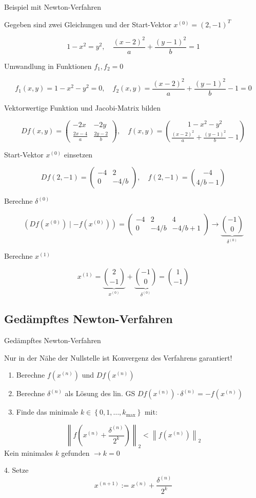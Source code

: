 \begin{example2}{Beispiel mit Newton-Verfahren}
    
Gegeben sind zwei Gleichungen und der Start-Vektor $x^{(0)}=(2,-1)^T$

$$
1-x^2=y^2, \quad \frac{(x-2)^2}{a}+\frac{(y-1)^2}{b}=1
$$


Umwandlung in Funktionen $f_1, f_2=0$

$$
f_1(x, y)=1-x^2-y^2=0, \quad f_2(x, y)=\frac{(x-2)^2}{a}+\frac{(y-1)^2}{b}-1=0
$$


Vektorwertige Funktion und Jacobi-Matrix bilden

$$
D f(x, y)=\left(\begin{array}{cc}
-2 x & -2 y \\
\frac{2 x-4}{a} & \frac{2 y-2}{b}
\end{array}\right), \quad f(x, y)=\binom{1-x^2-y^2}{\frac{(x-2)^2}{a}+\frac{(y-1)^2}{b}-1}
$$


Start-Vektor $x^{(0)}$ einsetzen

$$
D f(2,-1)=\left(\begin{array}{cc}
-4 & 2 \\
0 & -4 / b
\end{array}\right), \quad f(2,-1)=\binom{-4}{4 / b-1}
$$


Berechne $\delta^{(0)}$

$$
\left(D f\left(x^{(0)}\right) \mid-f\left(x^{(0)}\right)\right)=\left(\begin{array}{cc|c}
-4 & 2 & 4 \\
0 & -4 / b & -4 / b+1
\end{array}\right) \rightarrow \underbrace{\binom{-1}{0}}_{\delta^{(0)}}
$$


Berechne $x^{(1)}$

$$
x^{(1)}=\underbrace{\binom{2}{-1}}_{x^{(0)}}+\underbrace{\binom{-1}{0}}_{\delta^{(0)}}=\binom{1}{-1}
$$
\end{example2}

\subsection{Gedämpftes Newton-Verfahren}

\begin{corollary}{Gedämpftes Newton-Verfahren}

Nur in der Nähe der Nullstelle ist Konvergenz des Verfahrens garantiert!
\begin{enumerate}
    \item Berechne $f\left(x^{(n)}\right)$ und $D f\left(x^{(n)}\right)$
    \item Berechne $\delta^{(n)}$ als Lösung des lin. GS $D f\left(x^{(n)}\right) \cdot \delta^{(n)}=-f\left(x^{(n)}\right)$
    \item Finde das minimale $k \in\left\{0,1, \ldots, k_{\max }\right\}$ mit:
\end{enumerate}
$$
\left\|f\left(x^{(n)}+\frac{\delta^{(n)}}{2^k}\right)\right\|_2<\left\|f\left(x^{(n)}\right)\right\|_2
$$
Kein minimales $k$ gefunden $\rightarrow k=0$

4. Setze
$$
x^{(n+1)}:=x^{(n)}+\frac{\delta^{(n)}}{2^k}
$$
\end{corollary}

